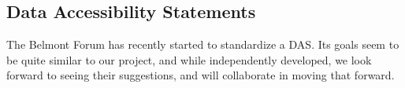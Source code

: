 \subsection{Data Accessibility Statements}
The Belmont Forum has recently started  to standardize a \ac{DAS}. Its goals seem to be quite similar to our project, and while independently developed, we look forward to seeing their suggestions, and will collaborate in moving that forward.
